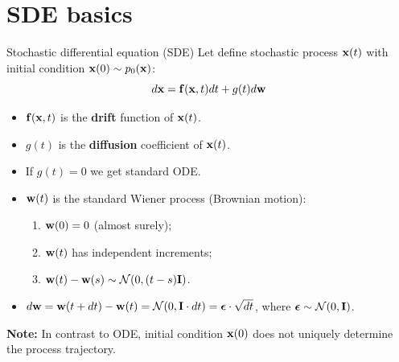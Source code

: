 \section{SDE basics}
\begin{frame}{Stochastic differential equation (SDE)}
	Let define stochastic process $\mathbf{x}(t)$ with initial condition $\mathbf{x}(0) \sim p_0(\mathbf{x})$:
	\[
		d\mathbf{x} = \mathbf{f}(\mathbf{x}, t) dt + g(t) d \mathbf{w}
	\]
	\vspace{-0.6cm}
	\begin{itemize}
		 \item $\mathbf{f}(\mathbf{x}, t)$ is the \textbf{drift} function of $\mathbf{x}(t)$.
		 \item $g(t)$ is the \textbf{diffusion} coefficient of $\mathbf{x}(t)$.
		 \item If $g(t) = 0$ we get standard ODE.
		 \item $\mathbf{w}(t)$ is the standard Wiener process (Brownian motion):
		 \begin{enumerate}
		 	\item $\mathbf{w}(0) = 0$ (almost surely);
		 	\item $\mathbf{w}(t)$ has independent increments;
			 \item $\mathbf{w}(t) - \mathbf{w}(s) \sim \mathcal{N}(0, (t - s) \mathbf{I})$.
		 \end{enumerate}
		 \item $d \mathbf{w} = \mathbf{w}(t + dt) - \mathbf{w}(t) = \mathcal{N}(0, \mathbf{I} \cdot dt ) = \boldsymbol{\epsilon} \cdot \sqrt{dt}$, where $\boldsymbol{\epsilon} \sim \mathcal{N}(0, \mathbf{I})$.
	\end{itemize}
	\textbf{Note:} In contrast to ODE, initial condition $\mathbf{x}(0)$ does not uniquely determine the process trajectory.
\end{frame}
